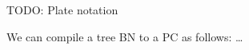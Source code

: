 \documentclass{article}
\begin{document}
TODO: Plate notation


We can compile a tree BN to a PC as follows: \ldots





\end{document}

